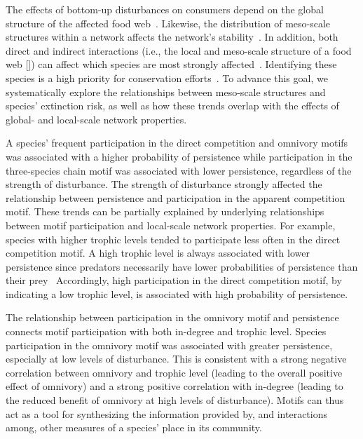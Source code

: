 \documentclass[12pt]{article}
\begin{document}
\begin{spacing}{2.0}
    The effects of bottom-up disturbances on consumers depend on the global structure of the affected food web~\citep{Dunne2002, Eklof2006, PascualDunne2006}.
    Likewise, the distribution of meso-scale structures within a network affects the network's stability~\citep{prill2005dynamic, bascompte2005simple}.
    In addition, both direct and indirect interactions (i.e., the local and meso-scale structure of a food web  [\citealp[]{Cirtwill2018FoodWebs}]) can affect which species are most strongly affected~\citep{curtsdotter2011robustness, dunne2009cascading, Eklof2006}. 
    Identifying these species is a high priority for conservation efforts~\citep{Bottrilletal2008}.
    To advance this goal, we systematically explore the relationships between meso-scale structures and species' extinction risk, as well as how these trends overlap with the effects of global- and local-scale network properties.

    
    A species' frequent participation in the direct competition and omnivory motifs was associated with a higher probability of persistence while participation in the three-species chain motif was associated with lower persistence, regardless of the strength of disturbance.
    The strength of disturbance strongly affected the relationship between persistence and participation in the apparent competition motif.
    These trends can be partially explained by underlying relationships between motif participation and local-scale network properties.
    For example, species with higher trophic levels tended to participate less often in the direct competition motif.
    A high trophic level is always associated with lower persistence since predators necessarily have lower probabilities of persistence than their prey~\citep{Eklof2013}
    Accordingly, high participation in the direct competition motif, by indicating a low trophic level, is associated with high probability of persistence.
    
    
    The relationship between participation in the omnivory motif and persistence connects motif participation with both in-degree and trophic level.
    Species participation in the omnivory motif was associated with greater persistence, especially at low levels of disturbance.
    This is consistent with a strong negative correlation between omnivory and trophic level (leading to the overall positive effect of omnivory) and a strong positive correlation with in-degree (leading to the reduced benefit of omnivory at high levels of disturbance). 
    Motifs can thus act as a tool for synthesizing the information provided by, and interactions among, other measures of a species' place in its community.
    

\end{spacing}
\end{document}
